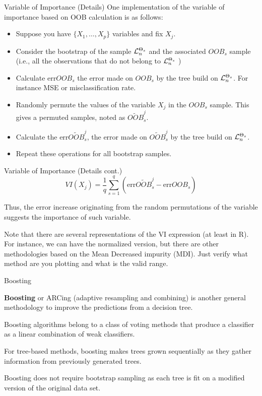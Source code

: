 \documentclass{beamer}
\begin{document}
\begin{frame}{Variable of Importance (Details)}
	One implementation of the variable of importance based on OOB calculation is as follows:
	\begin{itemize}
		\item Suppose you have $\{X_1, \ldots, X_p\}$ variables and fix $X_j$. 
		\item Consider the bootstrap of the sample ${\cal L}_n^{\Theta_s}$ and the associated $OOB_s$ sample (i.e., all the observations that do not belong to ${\cal L}_n^{\Theta_s}$ )
		\item Calculate $\text{err}OOB_s$ the error made on $OOB_s$ by the tree build on ${\cal L}_n^{\Theta_s}$. For instance MSE or misclassification rate.
		\item Randomly permute the values of the variable $X_j$ in the $OOB_s$ sample. This gives a permuted samples, noted as $\widetilde{OOB}_s^j$.
		\item Calculate the $\text{err}\widetilde{OOB}_s^j$, the error made on $\widetilde{OOB}_s^j$ by the tree build on ${\cal L}_n^{\Theta_s}$.
		\item Repeat these operations for all bootstrap samples. 
\end{itemize}
		
\end{frame}

\begin{frame}{Variable of Importance (Details cont.)}
	\begin{equation*}
		VI(X_j)= \frac{1}{q} \sum_{s=1}^q (\text{err}\widetilde{OOB}_s^j- \text{err}OOB_s)
	\end{equation*}	

Thus, the error increase originating from the random permutations of the variable suggests the importance of such variable. 

Note that there are several representations of the VI expression (at least in R). For instance, we can have the normalized version, but there are other methodologies based on the Mean Decreased impurity (MDI). Just verify what method are you plotting and what is the valid range. 

\end{frame}
	

\begin{frame}{Boosting}
	
	{\bf Boosting} or ARCing (adaptive resampling and combining) is another general methodology to improve the predictions from a decision tree.
	
	Boosting algorithms belong to a class of voting methods that produce a classifier as a linear combination of weak classifiers.
	 
	For tree-based methods, boosting makes trees grown sequentially as they gather information from previously generated trees. 
	
	
 Boosting does not require bootstrap sampling as each tree is fit on a modified version of the original data set.
 
 
	
\end{frame}
\end{document}
